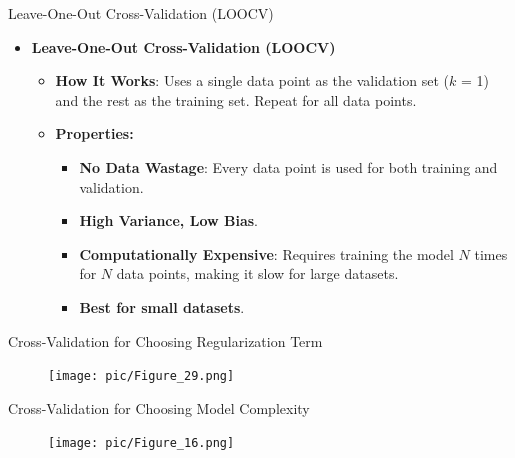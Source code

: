 \documentclass[serif, aspectratio=169]{beamer}
\begin{document}
\begin{frame}{Leave-One-Out Cross-Validation (LOOCV)}
    \begin{itemize}
        \item \textbf{Leave-One-Out Cross-Validation (LOOCV)}
            \medskip
            \begin{itemize}\itemsep1em
            \item \justifying \textbf{How It Works}:
            Uses a single data point as the validation set ($k$ = 1) and the rest as the training set. Repeat for all data points.
            \item \textbf{Properties:}
            \smallskip
            \begin{itemize}\itemsep.5em
                \item \textbf{No Data Wastage}:
                Every data point is used for both training and validation.
                \item \textbf{High Variance, Low Bias}.
                \item \justifying \textbf{Computationally Expensive}: 
                Requires training the model $N$ times for $N$ data points, making it slow for large datasets.
                \item \textbf{Best for small datasets}.
            \end{itemize}
        \end{itemize}
    \end{itemize}
\end{frame}

\begin{frame}{Cross-Validation for Choosing Regularization Term}
    \begin{figure}
        \centering
        \texttt{[image: pic/Figure\_29.png]}
    \end{figure}
    \vfill
\end{frame}

\begin{frame}{Cross-Validation for Choosing Model Complexity}
    \begin{figure}
        \centering
        \texttt{[image: pic/Figure\_16.png]}
    \end{figure}
\end{frame}
\end{document}
